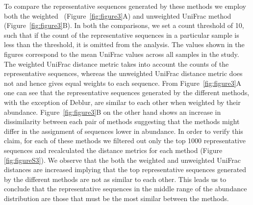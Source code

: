   To compare the representative sequences generated by these methods we employ both the weighted~\cite{Lozupone2007} (Figure~\ref{fig:figure3}A) and unweighted UniFrac method~\cite{Lozupone2005} (Figure~\ref{fig:figure3}B).
  In both the comparisons, we set a count threshold of 10, such that if the count of the representative sequences in a particular sample is less than the threshold, it is omitted from the analysis.
  The values shown in the figures correspond to the mean UniFrac values across all samples in the study.
  The weighted UniFrac distance metric takes into account the counts of the representative sequences, whereas the unweighted UniFrac distance metric does not and hence gives equal weights to each sequence.
  From Figure~\ref{fig:figure3}A one can see that the representative sequences generated by the different methods, with the exception of Deblur, are similar to each other when weighted by their abundance.
  Figure~\ref{fig:figure3}B on the other hand shows an increase in dissimilarity between each pair of methods suggesting that the methods might differ in the assignment of sequences lower in abundance.
  In order to verify this claim, for each of these methods we filtered out only the top 1000 representative sequences and recalculated the distance metrics for each method (Figure \ref{fig:figureS3}).
  We observe that the both the weighted and unweighted UniFrac distances are increased implying that the top representative sequences generated by the different methods are not as similar to each other.
  This leads us to conclude that the representative sequences in the middle range of the abundance distribution are those that must be the most similar between the methods.

